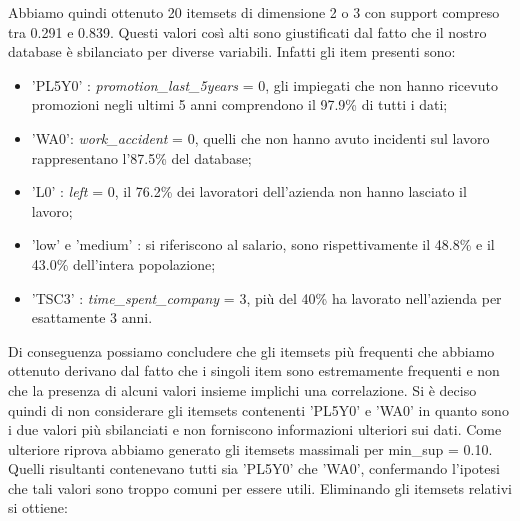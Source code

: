 	Abbiamo quindi ottenuto 20 itemsets di dimensione 2 o 3 con support compreso tra 0.291 e 0.839. Questi valori così alti sono giustificati dal fatto che il nostro database è sbilanciato per diverse variabili. Infatti gli item presenti sono:\vspace{-0.2cm}
	\begin{itemize}
		\item 'PL5Y0' : \textit{promotion\_last\_5years} = 0, gli impiegati che non hanno ricevuto promozioni negli ultimi 5 anni comprendono il 97.9\% di tutti i dati;\vspace{-0.2cm}
		\item 'WA0': \textit{work\_accident} = 0, quelli che non hanno avuto incidenti sul lavoro rappresentano l'87.5\% del database;
		\vspace{-0.2cm}
		\item 'L0' : \textit{left} = 0, il 76.2\% dei lavoratori dell'azienda non hanno lasciato il lavoro;\vspace{-0.2cm}
		\item 'low' e 'medium' : si riferiscono al salario, sono rispettivamente il 48.8\% e il 43.0\% dell'intera popolazione;\vspace{-0.2cm}
		\item 'TSC3' : \textit{time\_spent\_company} = 3, più del 40\% ha lavorato nell'azienda per esattamente 3 anni.\vspace{-0.2cm}
	\end{itemize} 
	Di conseguenza possiamo concludere che gli itemsets più frequenti che abbiamo ottenuto derivano dal fatto che i singoli item sono estremamente frequenti e non che la presenza di alcuni valori insieme implichi una correlazione. Si è deciso quindi di non considerare gli itemsets contenenti 'PL5Y0' e 'WA0' in quanto sono i due valori più sbilanciati e non forniscono informazioni ulteriori sui dati. Come ulteriore riprova abbiamo generato gli itemsets massimali per min\_sup = 0.10. Quelli risultanti contenevano tutti sia 'PL5Y0' che 'WA0', confermando l'ipotesi che tali valori sono troppo comuni per essere utili. Eliminando gli itemsets relativi si ottiene:
